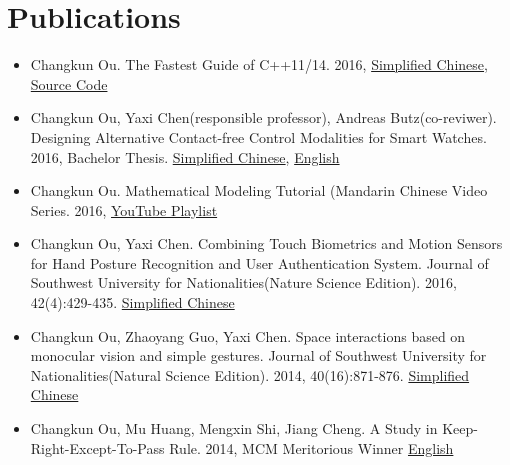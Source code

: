 \documentclass[letterpaper,11pt]{article}
\newcommand{\resumeSubHeadingListStart}{\begin{itemize}[leftmargin=*]}
\newcommand{\resumeSubHeadingListEnd}{\end{itemize}}
\begin{document}
\section{Publications}
 \resumeSubHeadingListStart
   \item{
       Changkun Ou.
       The Fastest Guide of C++11/14. 
       2016, 
       \href{https://www.gitbook.com/book/changkun/cpp1x-tutorial/details}{Simplified Chinese}, 
       \href{https://github.com/changkun/cpp1x-tutorial}{Source Code}
   }
   \item{
       Changkun Ou, Yaxi Chen(responsible professor), Andreas Butz(co-reviwer).
       Designing Alternative Contact-free Control Modalities for Smart Watches. 
       2016, Bachelor Thesis. \href{https://changkun.us/files/cv/bachelor-thesis-cn.html}{Simplified Chinese}, 
       \href{https://changkun.us/files/cv/bachelor-thesis-en.html}{English}
   }
   \item{
       Changkun Ou.
       Mathematical Modeling Tutorial (Mandarin Chinese Video Series.
       2016, \href{https://www.youtube.com/watch?v=EUfXE3vP9_A&list=PLwUqqMt5en7c7iZIseCVAS5BX6RPkS-qR}{YouTube Playlist}
   }
   \item{
       Changkun Ou, Yaxi Chen. 
       Combining Touch Biometrics and Motion Sensors for Hand Posture Recognition and User Authentication System. 
       Journal of Southwest University for Nationalities(Nature Science Edition). 
       2016, 42(4):429-435. \href{https://changkun.us/files/cv/touch.swun.html}{Simplified Chinese}
   }
   \item{
       Changkun Ou, Zhaoyang Guo, Yaxi Chen.
       Space interactions based on monocular vision and simple gestures. 
       Journal of Southwest University for Nationalities(Natural Science Edition). 
       2014, 40(16):871-876. \href{https://changkun.us/files/cv/vision.swun.html}{Simplified Chinese}
   }
   \item{
       Changkun Ou, Mu Huang, Mengxin Shi, Jiang Cheng. 
       A Study in Keep-Right-Except-To-Pass Rule. 
       2014, MCM Meritorious Winner \href{https://changkun.us/files/cv/28922.public.html}{English}
   }
 \resumeSubHeadingListEnd
\end{document}
